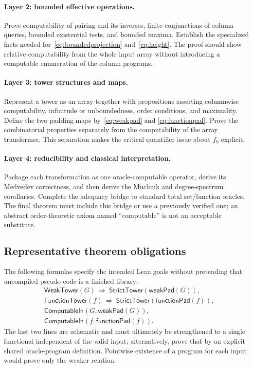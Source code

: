 \documentclass[11pt,a4paper]{article}
\theoremstyle{definition}\newtheorem{definition}[theorem]{Definition}
\theoremstyle{remark}\newtheorem{remark}[theorem]{Remark}
\begin{document}
\paragraph{Layer 2: bounded effective operations.}
Prove computability of pairing and its inverses, finite conjunctions of column
queries, bounded existential tests, and bounded maxima. Establish the
specialized facts needed for~\eqref{eq:boundedprojection} and~\eqref{eq:height}.
The proof should show relative computability from the whole input array
without introducing a computable enumeration of the column programs.

\paragraph{Layer 3: tower structures and maps.}
Represent a tower as an array together with propositions asserting columnwise
computability, infinitude or unboundedness, order conditions, and maximality.
Define the two padding maps by~\eqref{eq:weakpad} and
\eqref{eq:functionpad}. Prove the combinatorial properties separately from
the computability of the array transformer. This separation makes the
critical quantifier issue about $f_0$ explicit.

\paragraph{Layer 4: reducibility and classical interpretation.}
Package each transformation as one oracle-computable operator, derive its
Medvedev correctness, and then derive the Muchnik and degree-spectrum
corollaries. Complete the adequacy bridge to standard total set/function
oracles. The final theorem must include this bridge or use a previously
verified one; an abstract order-theoretic axiom named ``computable'' is not
an acceptable substitute.

\subsection{Representative theorem obligations}
The following formulas specify the intended Lean goals without pretending
that uncompiled pseudo-code is a finished library:
\begin{align*}
 &\mathsf{WeakTower}(G)\ \Longrightarrow\
       \mathsf{StrictTower}(\mathsf{weakPad}(G)),\\
 &\mathsf{FunctionTower}(f)\ \Longrightarrow\
       \mathsf{StrictTower}(\mathsf{functionPad}(f)),\\
 &\mathsf{ComputableIn}(G,\mathsf{weakPad}(G)),\\
 &\mathsf{ComputableIn}(f,\mathsf{functionPad}(f)).
\end{align*}
The last two lines are schematic and must ultimately be strengthened to a
single functional independent of the valid input; alternatively, prove that
by an explicit shared oracle-program definition. Pointwise existence of a
program for each input would prove only the weaker relation.
\end{document}
